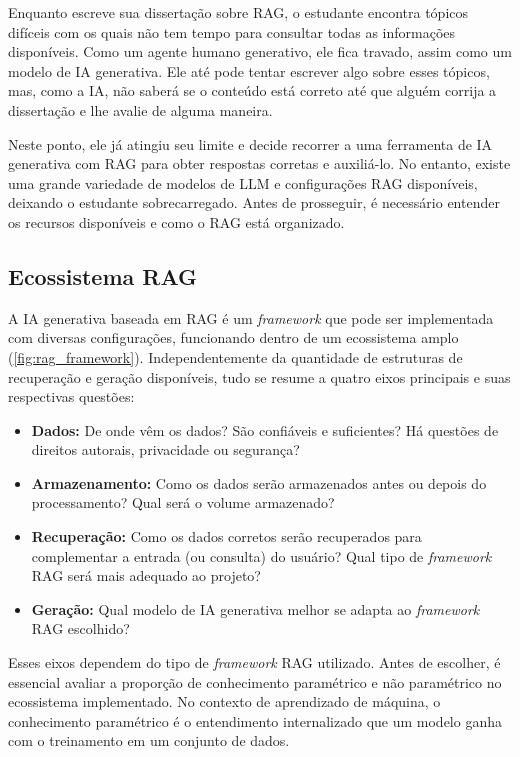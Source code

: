 \documentclass[a4paper, 12pt]{article}
\begin{document}
    Enquanto escreve sua dissertação sobre RAG, o estudante encontra tópicos difíceis com os quais não tem tempo para consultar todas as informações disponíveis. Como um agente humano generativo, ele fica travado, assim como um modelo de IA generativa. Ele até pode tentar escrever algo sobre esses tópicos, mas, como a IA, não saberá se o conteúdo está correto até que alguém corrija a dissertação e lhe avalie de alguma maneira.

    Neste ponto, ele já atingiu seu limite e decide recorrer a uma ferramenta de IA generativa com RAG para obter respostas corretas e auxiliá-lo. No entanto, existe uma grande variedade de modelos de LLM e configurações RAG disponíveis, deixando o estudante sobrecarregado. Antes de prosseguir, é necessário entender os recursos disponíveis e como o RAG está organizado.

    \subsection{Ecossistema RAG}

    A IA generativa baseada em RAG é um \textit{framework} que pode ser implementada com diversas configurações, funcionando dentro de um ecossistema amplo (\autoref{fig:rag_framework}). Independentemente da quantidade de estruturas de recuperação e geração disponíveis, tudo se resume a quatro eixos principais e suas respectivas questões:
    
    \begin{itemize}
        \item \textbf{Dados:} De onde vêm os dados? São confiáveis e suficientes? Há questões de direitos autorais, privacidade ou segurança?
        \item \textbf{Armazenamento:} Como os dados serão armazenados antes ou depois do processamento? Qual será o volume armazenado?
        \item \textbf{Recuperação:} Como os dados corretos serão recuperados para complementar a entrada (ou consulta) do usuário? Qual tipo de \textit{framework} RAG será mais adequado ao projeto?
        \item \textbf{Geração:} Qual modelo de IA generativa melhor se adapta ao \textit{framework} RAG escolhido?
    \end{itemize} 

    Esses eixos dependem do tipo de \textit{framework} RAG utilizado. Antes de escolher, é essencial avaliar a proporção de conhecimento paramétrico e não paramétrico no ecossistema implementado. No contexto de aprendizado de máquina, o conhecimento paramétrico é o entendimento internalizado que um modelo ganha com o treinamento em um conjunto de dados. 
    
\end{document}
